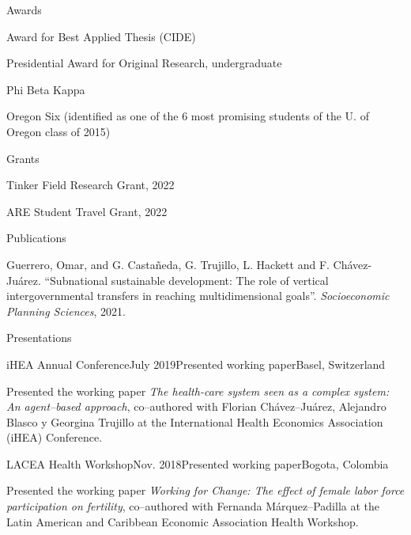 \documentclass{resume} %
\begin{document}

\begin{rSection}{Awards} \itemsep -2pt
\item Award for Best Applied Thesis (CIDE)
\item Presidential Award for Original Research, undergraduate
\item Phi Beta Kappa
\item Oregon Six (identified as one of the 6 most promising students of the U. of Oregon class of 2015)

\end{rSection}

\begin{rSection}{Grants} \itemsep -2pt
\item Tinker Field Research Grant, 2022
\item ARE Student Travel Grant, 2022

\end{rSection}

\begin{rSection}{Publications}
\item Guerrero, Omar, and G. Castañeda, G. Trujillo, L. Hackett and F. Chávez-Juárez. ``Subnational sustainable development: The role of vertical intergovernmental transfers in reaching multidimensional goals''. \textit{Socioeconomic Planning Sciences}, 2021.
\end{rSection}


\begin{rSection}{Presentations}

\begin{rSubsection}{iHEA Annual Conference}{July 2019}{Presented working paper}{Basel, Switzerland}
\item Presented the working paper \textit{The health-care system seen as a complex system: An agent--based approach}, co--authored with Florian Chávez--Juárez, Alejandro Blasco y Georgina Trujillo at the International Health Economics Association (iHEA) Conference.
\end{rSubsection}

\begin{rSubsection}{LACEA Health Workshop}{Nov. 2018}{Presented working paper}{Bogota, Colombia}
\item Presented the working paper \textit{Working for Change: The effect of female labor force participation on fertility}, co--authored with Fernanda Márquez--Padilla at the Latin American and Caribbean Economic Association Health Workshop.
\end{rSubsection}

\end{rSection}
\end{document}
